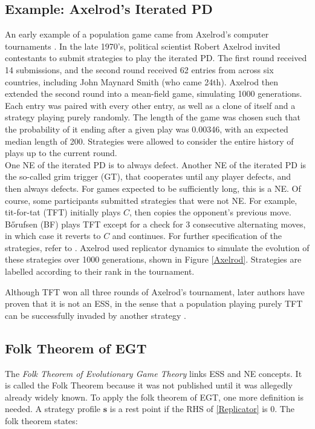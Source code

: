 \subsection{Example: Axelrod's Iterated PD} \label{IPD}
An early example of a population game came from Axelrod's computer tournaments \cite{RN89}. In the late 1970's, political scientist Robert Axelrod invited contestants to submit strategies to play the iterated PD. The first round received 14 submissions, and the second round received 62 entries from across six countries, including John Maynard Smith (who came 24th). Axelrod then extended the second round into a mean-field game, simulating 1000 generations. Each entry was paired with every other entry, as well as a clone of itself and a strategy playing purely randomly. The length of the game was chosen such that the probability of it ending after a given play was 0.00346, with an expected median length of 200. Strategies were allowed to consider the entire history of plays up to the current round. \\

One NE of the iterated PD is to always defect. Another NE of the iterated PD is the so-called grim trigger (GT), that cooperates until any player defects, and then always defects. For games expected to be sufficiently long, this is a NE. Of course, some participants submitted strategies that were not NE. For example, tit-for-tat (TFT) initially plays $C$, then copies the opponent's previous move. B\H{o}rufsen (BF) plays TFT except for a check for 3 consecutive alternating moves, in which case it reverts to $C$ and continues. For further specification of the strategies, refer to \cite{RN89}. Axelrod used replicator dynamics to simulate the evolution of these strategies over 1000 generations, shown in Figure \ref{Axelrod}. Strategies are labelled according to their rank in the tournament. \\
\FloatBarrier
{}
\FloatBarrier

Although TFT won all three rounds of Axelrod's tournament, later authors have proven that it is not an ESS, in the sense that a population playing purely TFT can be successfully invaded by another strategy \cite{RN90}.
\subsection{Folk Theorem of EGT}
The \emph{Folk Theorem of Evolutionary Game Theory} links ESS and NE concepts. It is called the Folk Theorem because it was not published until it was allegedly already widely known. To apply the folk theorem of EGT, one more definition is needed. A strategy profile $\mathbf{s}$ is a rest point if the RHS of \ref{Replicator} is 0. The folk theorem states:

